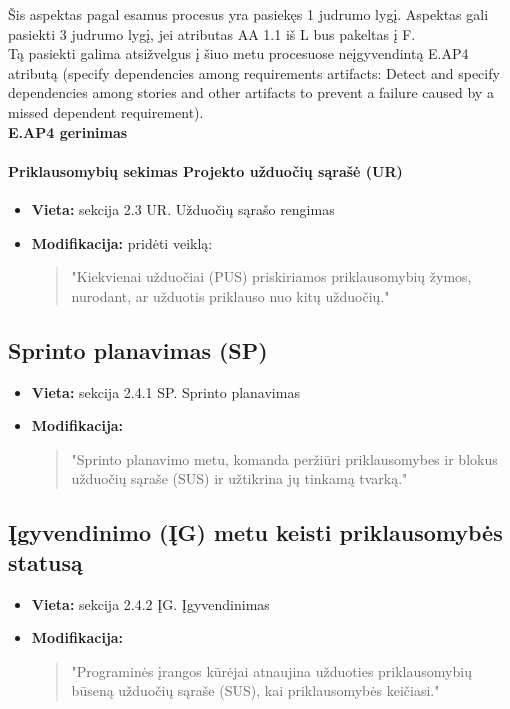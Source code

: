 \documentclass{article}
\begin{document}
Šis aspektas pagal esamus procesus yra pasiekęs 1 judrumo lygį. Aspektas gali pasiekti 3 judrumo lygį, jei atributas
AA 1.1 iš L bus pakeltas į F. \\

Tą pasiekti galima atsižvelgus į šiuo metu procesuose neįgyvendintą E.AP4 atributą (specify dependencies among requirements artifacts: Detect and specify dependencies among stories and other artifacts to prevent a failure caused by a missed dependent requirement). \\

\textbf{E.AP4 gerinimas} 

\paragraph{Priklausomybių sekimas Projekto užduočių sąrašė (UR)}
\begin{itemize}
    \item \textbf{Vieta:} sekcija 2.3 UR. Užduočių sąrašo rengimas
    \item \textbf{Modifikacija:} pridėti veiklą:
    \begin{quote}
        "Kiekvienai užduočiai (PUS) priskiriamos priklausomybių žymos, nurodant, ar užduotis priklauso nuo kitų užduočių."
    \end{quote}
\end{itemize}

\subsection*{Sprinto planavimas (SP)}
\begin{itemize}
    \item \textbf{Vieta:} sekcija 2.4.1 SP. Sprinto planavimas
    \item \textbf{Modifikacija:} 
    \begin{quote}
        "Sprinto planavimo metu, komanda peržiūri priklausomybes ir blokus užduočių sąraše (SUS) ir užtikrina jų tinkamą tvarką."
    \end{quote}
\end{itemize}

\subsection*{Įgyvendinimo (ĮG) metu keisti priklausomybės statusą}
\begin{itemize}
    \item \textbf{Vieta:} sekcija 2.4.2 ĮG. Įgyvendinimas
    \item \textbf{Modifikacija:}
    \begin{quote}
        "Programinės įrangos kūrėjai atnaujina užduoties priklausomybių būseną užduočių sąraše (SUS), kai priklausomybės keičiasi."
    \end{quote}
\end{itemize}
\end{document}
